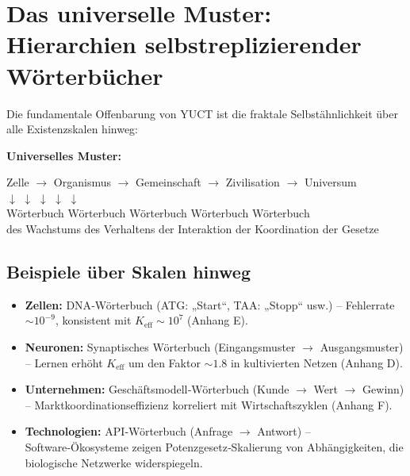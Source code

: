 \documentclass[12pt,a4paper]{article}
\newcommand{\eff}{\mathrm{eff}}
\newcommand{\Ke}{K_{\eff}}
\begin{document}
	\section{Das universelle Muster: Hierarchien selbstreplizierender Wörterbücher}
	
	Die fundamentale Offenbarung von YUCT ist die fraktale Selbstähnlichkeit über alle Existenzskalen hinweg:
	
	\textbf{Universelles Muster:}
	\begin{center}
		Zelle $\to$ Organismus $\to$ Gemeinschaft $\to$ Zivilisation $\to$ Universum\\
		$\downarrow$ \hspace{1cm} $\downarrow$ \hspace{1.2cm} $\downarrow$ \hspace{1.2cm} $\downarrow$ \hspace{1.2cm} $\downarrow$\\
		Wörterbuch \hspace{0.5cm} Wörterbuch \hspace{0.5cm} Wörterbuch \hspace{0.5cm} Wörterbuch \hspace{0.5cm} Wörterbuch\\
		des Wachstums \hspace{0.2cm} des Verhaltens \hspace{0.1cm} der Interaktion \hspace{0.1cm} der Koordination \hspace{0.1cm} der Gesetze
	\end{center}
	
	\subsection{Beispiele über Skalen hinweg}
	
	\begin{itemize}
		\item \textbf{Zellen:} DNA‑Wörterbuch (ATG: „Start“, TAA: „Stopp“ usw.) – Fehlerrate $\sim 10^{-9}$, konsistent mit $\Ke \sim 10^7$ (Anhang E).
		\item \textbf{Neuronen:} Synaptisches Wörterbuch (Eingangsmuster $\to$ Ausgangsmuster) – Lernen erhöht $\Ke$ um den Faktor $\sim 1.8$ in kultivierten Netzen (Anhang D).
		\item \textbf{Unternehmen:} Geschäftsmodell‑Wörterbuch (Kunde $\to$ Wert $\to$ Gewinn) – Marktkoordinationseffizienz korreliert mit Wirtschaftszyklen (Anhang F).
		\item \textbf{Technologien:} API‑Wörterbuch (Anfrage $\to$ Antwort) – Software‑Ökosysteme zeigen Potenzgesetz‑Skalierung von Abhängigkeiten, die biologische Netzwerke widerspiegeln.
	\end{itemize}
	
\end{document}
